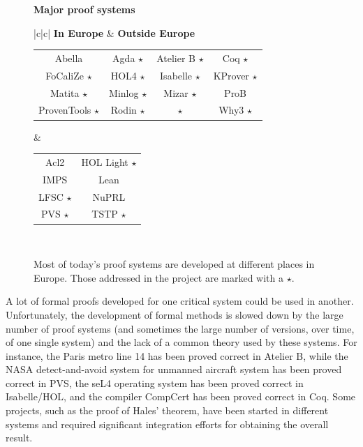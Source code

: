\newcommand\s{ $\star$}
\begin{figure}[ht]
  \begin{shaded}
    \begin{center}
      {\bf \Large Major proof systems}\\[5mm]
      \begin{tabular}{|c|c|}\hline
       {\bf In Europe} & {\bf Outside Europe}\\\hline
        \begin{minipage}{10cm}
          \begin{tabular}{cccc}
            Abella & Agda\s & Atelier B\s & Coq\s\\
            FoCaliZe\s & HOL4\s & Isabelle\s & KProver\s\\
            Matita\s & Minlog\s & Mizar\s & ProB\\
            ProvenTools\s & Rodin\s & \tlaplus\s & Why3\s\\
          \end{tabular}
        \end{minipage}
        &\begin{minipage}{4cm}
           \begin{tabular}{cc}
             Acl2 & HOL Light\s\\
             IMPS & Lean\\
             LFSC\s & NuPRL\\
             PVS\s & TSTP\s
           \end{tabular}
         \end{minipage}\\\hline
      \end{tabular}
    \end{center}
    \vspace{-5mm}
    \caption{Most of today's proof systems are developed at different
      places in Europe. Those addressed in the project are marked with
      a $\star$.\label{systems}}
  \end{shaded}
\end{figure}


A lot of formal proofs developed for one critical system could be used
in another.  Unfortunately, the development of formal methods is
slowed down by the large number of proof systems (and sometimes the
large number of versions, over time, of one single system) and the
lack of a common theory used by these systems.  For instance, the
Paris metro line 14 has been proved correct in Atelier B, while the
NASA detect-and-avoid system for unmanned aircraft system has been
proved correct in PVS, the seL4 operating system has been proved
correct in Isabelle/HOL\cite{paulson700}, and the compiler CompCert
has been proved correct in Coq.  Some projects, such as the proof of
Hales' theorem, have been started in different systems and required
significant integration efforts for obtaining the overall result.

